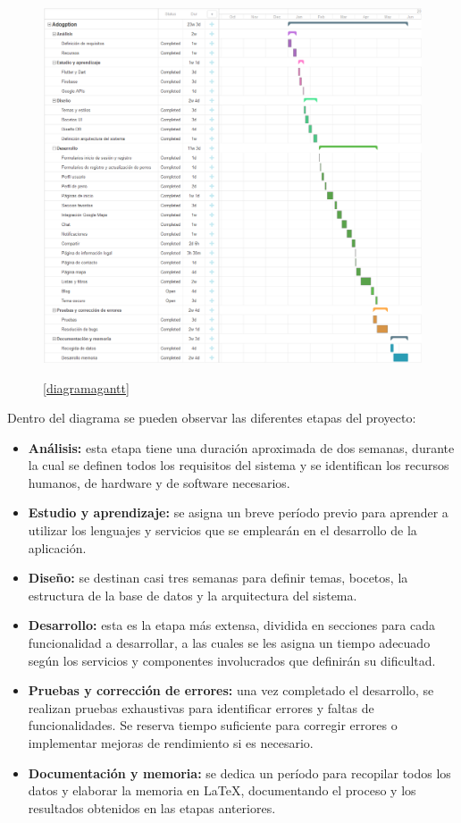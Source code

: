 \documentclass[a4paper, 12pt]{article}
\begin{document}
\begin{figure}[H]
	{\includegraphics[width=15cm]{diagram/GanntSmall2.png}\par}
	\label{fig:diagramagantt}\ref{diagramagantt}
\end{figure}

Dentro del diagrama se pueden observar las diferentes etapas del proyecto:

\begin{itemize}[noitemsep]
	\item \textbf{Análisis:} esta etapa tiene una duración aproximada de dos semanas, durante la cual se definen todos los requisitos del sistema y se identifican los recursos humanos, de hardware y de software necesarios.
	\item \textbf{Estudio y aprendizaje:} se asigna un breve período previo para aprender a utilizar los lenguajes y servicios que se emplearán en el desarrollo de la aplicación.
	\item \textbf{Diseño:} se destinan casi tres semanas para definir temas, bocetos, la estructura de la base de datos y la arquitectura del sistema.
	\item \textbf{Desarrollo:} esta es la etapa más extensa, dividida en secciones para cada funcionalidad a desarrollar, a las cuales se les asigna un tiempo adecuado según los servicios y componentes involucrados que definirán su dificultad.
	\item \textbf{Pruebas y corrección de errores:} una vez completado el desarrollo, se realizan pruebas exhaustivas para identificar errores y faltas de funcionalidades. Se reserva tiempo suficiente para corregir errores o implementar mejoras de rendimiento si es necesario.
	\item \textbf{Documentación y memoria:} se dedica un período para recopilar todos los datos y elaborar la memoria en LaTeX, documentando el proceso y los resultados obtenidos en las etapas anteriores.
\end{itemize}
\end{document}
